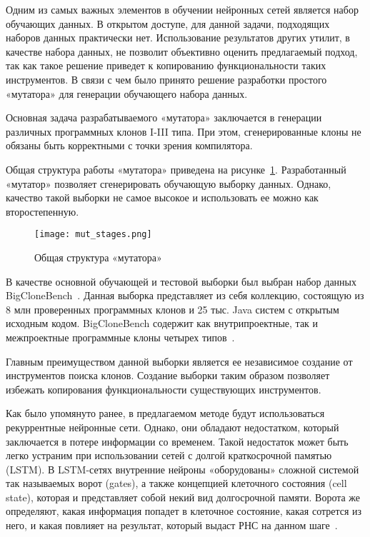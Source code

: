 Одним из самых важных элементов в обучении нейронных сетей является набор обучающих данных. В открытом доступе, для данной задачи, подходящих наборов данных практически нет. Использование результатов других утилит, в качестве набора данных, не позволит объективно оценить предлагаемый подход, так как такое решение приведет к копированию функциональности таких инструментов. В связи с чем было принято решение разработки простого «мутатора» для генерации обучающего набора данных.

Основная задача разрабатываемого «мутатора» заключается в генерации различных программных клонов I-III типа. При этом, сгенерированные клоны не обязаны быть корректными с точки зрения компилятора.

Общая структура работы «мутатора» приведена на рисунке~\ref{fig:mut_stages}. Разработанный «мутатор» позволяет сгенерировать обучающую выборку данных. Однако, качество такой выборки не самое высокое и использовать ее можно как второстепенную.

\begin{figure}[htbp]
\centering
\texttt{[image: mut\_stages.png]}
\caption{Общая структура «мутатора»}
\label{fig:mut_stages}
\end{figure}

В качестве основной обучающей и тестовой выборки был выбран набор данных BigCloneBench~\cite{bcb}. Данная выборка представляет из себя коллекцию, состоящую из 8 млн проверенных программных клонов и 25 тыс. Java систем с открытым исходным кодом. BigCloneBench содержит как внутрипроектные, так и межпроектные программные клоны четырех типов~\cite{bcb}.

Главным преимуществом данной выборки является ее независимое создание от инструментов поиска клонов. Создание выборки таким образом позволяет избежать копирования функциональности существующих инструментов. 

Как было упомянуто ранее, в предлагаемом методе будут использоваться рекуррентные нейронные сети. Однако, они обладают недостатком, который заключается в потере информации со временем. Такой недостаток может быть легко устраним при использовании сетей с долгой краткосрочной памятью (LSTM). В LSTM-сетях внутренние нейроны «оборудованы» сложной системой так называемых ворот (gates), а также концепцией клеточного состояния (cell state), которая и представляет собой некий вид долгосрочной памяти. Ворота же определяют, какая информация попадет в клеточное состояние, какая сотрется из него, и какая повлияет на результат, который выдаст РНС на данном шаге~\cite{siam}.

